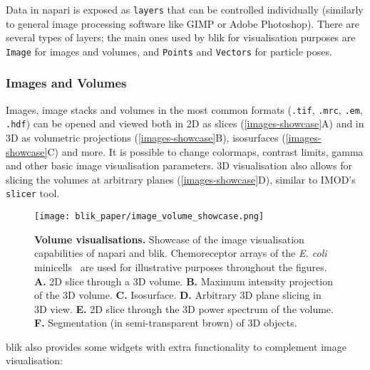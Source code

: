 Data in napari is exposed as \texttt{layers} that can be controlled individually (similarly to general image processing software like GIMP or Adobe Photoshop). There are several types of layers; the main ones used by blik for visualisation purposes are \texttt{Image} for images and volumes, and \texttt{Points} and \texttt{Vectors} for particle poses.

\subsubsection{Images and Volumes}\label{images-and-volumes}

Images, image stacks and volumes in the most common formats (\texttt{.tif}, \texttt{.mrc}, \texttt{.em}, \texttt{.hdf}) can be opened and viewed both in 2D as slices (\autoref{images-showcase}A) and in 3D as volumetric projections (\autoref{images-showcase}B), isosurfaces (\autoref{images-showcase}C) and more. It is possible to change colormaps, contrast limits, gamma and other basic image visualisation parameters. 3D visualisation also allows for slicing the volumes at arbitrary planes (\autoref{images-showcase}D), similar to IMOD's \texttt{slicer} tool.

\begin{figure}[!ht]
    \centering
    \texttt{[image: blik\_paper/image\_volume\_showcase.png]}
    \caption[Volume visualisations]{\textbf{Volume visualisations.} Showcase of the image visualisation capabilities of napari and blik. Chemoreceptor arrays of the \textit{E. coli} minicells~\cite{burtCompleteStructureChemosensory2020} are used for illustrative purposes throughout the figures. \textbf{A.} 2D slice through a 3D volume. \textbf{B.} Maximum intensity projection of the 3D volume. \textbf{C.} Isosurface. \textbf{D.} Arbitrary 3D plane slicing in 3D view. \textbf{E.} 2D slice through the 3D power spectrum of the volume. \textbf{F.} Segmentation (in semi-transparent brown) of 3D objects.}
    \label{images-showcase}
\end{figure}

blik also provides some widgets with extra functionality to complement image visualisation:

